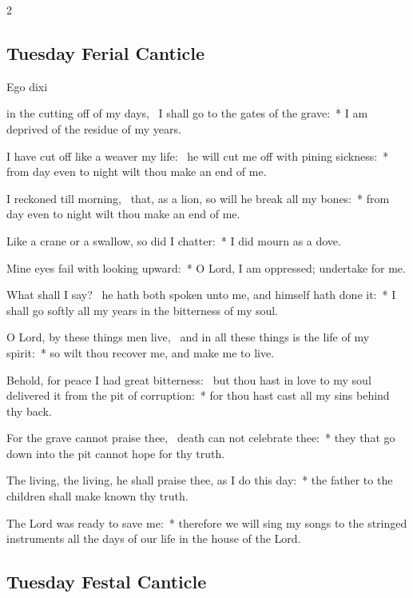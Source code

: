 \begin{multicols}{2}
\subsection{Tuesday Ferial Canticle}

\begin{inhead}
Ego dixi
\end{inhead}

 in the cutting off of my days,~{\dag} I shall go to the gates of the grave:~* I am deprived of the residue of my years.\par
{}
I have cut off like a weaver my life:~{\dag} he will cut me off with pining sickness:~* from day even to night wilt thou make an end of me.\par
I reckoned till morning,~{\dag} that, as a lion, so will he break all my bones:~* from day even to night wilt thou make an end of me.\par
Like a crane or a swallow, so did I chatter:~* I did mourn as a dove.\par
Mine eyes fail with looking upward:~* O Lord, I am oppressed; undertake for me.\par
What shall I say?~{\dag} he hath both spoken unto me, and himself hath done it:~* I shall go softly all my years in the bitterness of my soul.\par
O Lord, by these things men live,~{\dag} and in all these things is the life of my spirit:~* so wilt thou recover me, and make me to live.\par
Behold, for peace I had great bitterness:~{\dag} but thou hast in love to my soul delivered it from the pit of corruption:~* for thou hast cast all my sins behind thy back.\par
For the grave cannot praise thee,~{\dag} death can not celebrate thee:~* they that go down into the pit cannot hope for thy truth.\par
The living, the living, he shall praise thee, as I do this day:~* the father to the children shall make known thy truth.\par
The Lord was ready to save me:~* therefore we will sing my songs to the stringed instruments all the days of our life in the house of the Lord.

\subsection{Tuesday Festal Canticle}


\end{multicols}
